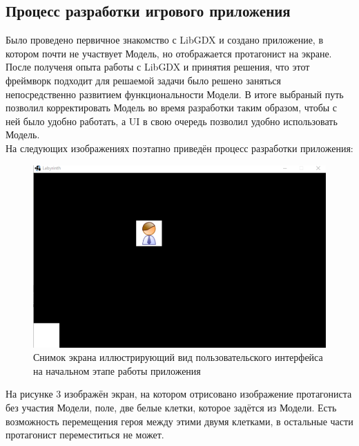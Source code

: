 \subsection{Процесс разработки игрового приложения}

Было проведено первичное знакомство с LibGDX и создано приложение, в котором почти не участвует Модель, но отображается протагонист на экране. После полученя опыта работы с LibGDX и принятия решения, что этот фреймворк подходит для решаемой задачи было решено заняться непосредственно развитием функциональности Модели. В итоге выбраный путь позволил корректировать Модель во время разработки таким образом, чтобы с ней было удобно работать, а UI в свою очередь позволил удобно использовать Модель.\\


На следующих изображениях поэтапно приведён процесс разработки приложения:

\begin{figure}[H]
	\begin{center}
		\includegraphics[scale=0.7]{pics/01.png}
		\caption{Снимок экрана иллюстрирующий вид пользовательского интерфейса на начальном этапе работы приложения} 
		\label{pic:pic_name} %
	\end{center}
\end{figure}

На рисунке 3 изображён экран, на котором отрисовано изображение протагониста без участия Модели, поле, две белые клетки, которое задётся из Модели. Есть возможность перемещения героя между этими двумя клетками, в остальные части протагонист переместиться не может. 

